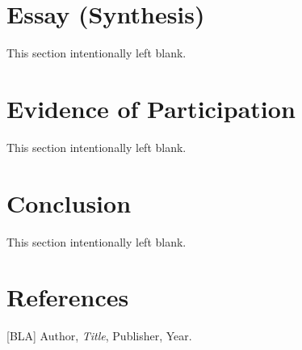 \documentclass[11pt]{article}
\begin{document}
\section{Essay (Synthesis)}
This section intentionally left blank.

\section{Evidence of Participation}
This section intentionally left blank.

\section{Conclusion}
This section intentionally left blank.

\section*{References}
[BLA] Author, \emph{Title}, Publisher, Year.
\end{document}
